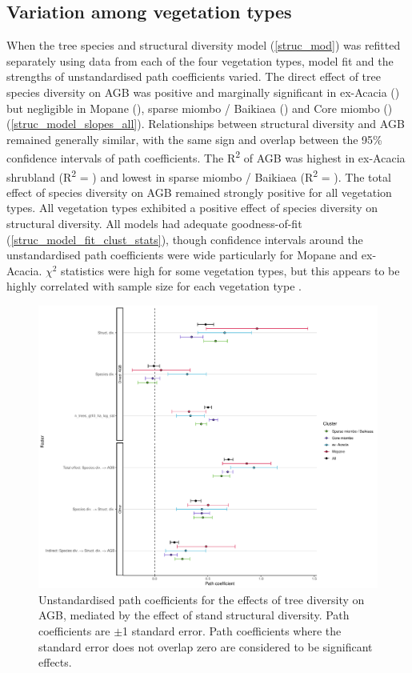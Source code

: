 \documentclass[11pt,a4paper]{article}
\begin{document}
\subsection{Variation among vegetation types}

When the tree species and structural diversity model (\autoref{struc_mod}) was refitted separately using data from each of the four vegetation types, model fit and the strengths of unstandardised path coefficients varied. The direct effect of tree species diversity on AGB was positive and marginally significant in ex-Acacia (\strucbetacsb{}) but negligible in Mopane (\strucbetadsb{}), sparse miombo / Baikiaea (\strucbetaasb{}) and Core miombo (\strucbetabsb{}) (\autoref{struc_model_slopes_all}). Relationships between structural diversity and AGB remained generally similar, with the same sign and overlap between the 95\% confidence intervals of path coefficients. The R\textsuperscript{2} of AGB was highest in ex-Acacia shrubland (R\textsuperscript{2} = \struccrsq{}) and lowest in sparse miombo / Baikiaea (R\textsuperscript{2} = \strucarsq{}). The total effect of species diversity on AGB remained strongly positive for all vegetation types. All vegetation types exhibited a positive effect of species diversity on structural diversity. All models had adequate goodness-of-fit (\autoref{struc_model_fit_clust_stats}), though confidence intervals around the unstandardised path coefficients were wide particularly for Mopane and ex-Acacia. $\chi^{2}$ statistics were high for some vegetation types, but this appears to be highly correlated with sample size for each vegetation type \citep{Hooper2008}.

\begin{figure}[H]
\centering
	\includegraphics[width=\textwidth]{struc_model_slopes_all}
	\caption{Unstandardised path coefficients for the effects of tree diversity on AGB, mediated by the effect of stand structural diversity. Path coefficients are $\pm$1 standard error. Path coefficients where the standard error does not overlap zero are considered to be significant effects.}
	\label{struc_model_slopes_all}
\end{figure}
\end{document}
